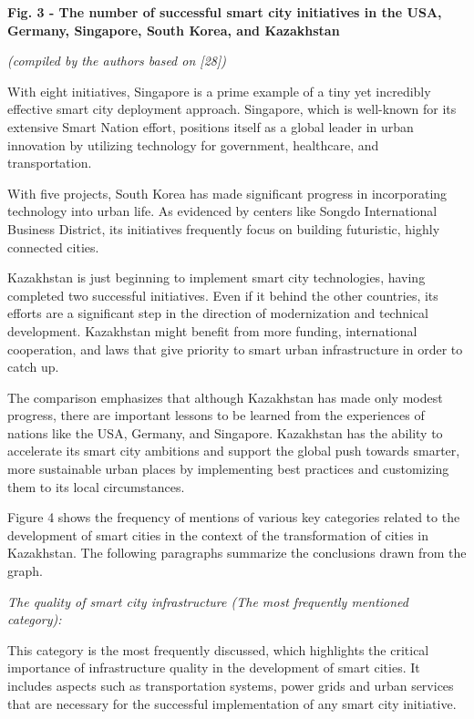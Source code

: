 {\bfseries Fig. 3 - The number of successful smart city initiatives in the USA, Germany, Singapore, South Korea, and Kazakhstan}

\emph{(compiled by the authors based on {[}28{]})}

\begin{multicols}{2}
With eight initiatives, Singapore is a prime example of a tiny yet
incredibly effective smart city deployment approach. Singapore, which is
well-known for its extensive Smart Nation effort, positions itself as a
global leader in urban innovation by utilizing technology for
government, healthcare, and transportation.

With five projects, South Korea has made significant progress in
incorporating technology into urban life. As evidenced by centers like
Songdo International Business District, its initiatives frequently focus
on building futuristic, highly connected cities.

Kazakhstan is just beginning to implement smart city technologies,
having completed two successful initiatives. Even if it behind the other
countries, its efforts are a significant step in the direction of
modernization and technical development. Kazakhstan might benefit from
more funding, international cooperation, and laws that give priority to
smart urban infrastructure in order to catch up.

The comparison emphasizes that although Kazakhstan has made only modest
progress, there are important lessons to be learned from the experiences
of nations like the USA, Germany, and Singapore. Kazakhstan has the
ability to accelerate its smart city ambitions and support the global
push towards smarter, more sustainable urban places by implementing best
practices and customizing them to its local circumstances.

Figure 4 shows the frequency of mentions of various key categories
related to the development of smart cities in the context of the
transformation of cities in Kazakhstan. The following paragraphs
summarize the conclusions drawn from the graph.

\emph{The quality of smart city infrastructure (The most frequently
mentioned category):}

This category is the most frequently discussed, which highlights the
critical importance of infrastructure quality in the development of
smart cities. It includes aspects such as transportation systems, power
grids and urban services that are necessary for the successful
implementation of any smart city initiative.


\end{multicols}
